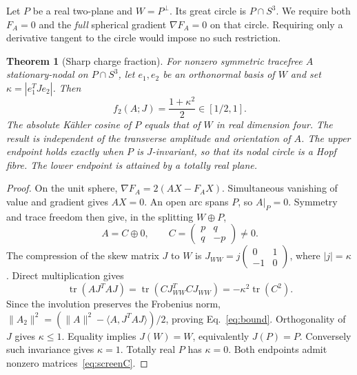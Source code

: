 \documentclass[11pt,a4paper]{article}
\newtheorem{theorem}{Theorem}\newtheorem{corollary}{Corollary}
\newcommand{\tr}{\operatorname{tr}}\newcommand{\asympart}{\operatorname{Asym}}
\begin{document}
Let $P$ be a real two-plane and $W=P^\perp$. Its great circle is
$P\cap S^3$. We require both $F_A=0$ and the \emph{full} spherical
gradient $\nabla F_A=0$ on that circle. Requiring only a derivative
tangent to the circle would impose no such restriction.

\begin{theorem}[Sharp charge fraction]
\label{thm:charge}
For nonzero symmetric tracefree $A$ stationary-nodal on $P\cap S^3$,
let $e_1,e_2$ be an orthonormal basis of $W$ and set
$\kappa=|e_1^TJe_2|$. Then
\begin{equation}
 \boxed{f_2(A;J)=\frac{1+\kappa^2}{2}\in[1/2,1].}
 \label{eq:bound}
\end{equation}
The absolute K\"ahler cosine of $P$ equals that of $W$ in real dimension four.
The result is independent of the transverse amplitude and orientation
of $A$. The upper endpoint holds exactly when $P$ is $J$-invariant,
so that its nodal circle is a Hopf fibre. The lower endpoint is attained
by a totally real plane.
\end{theorem}

\begin{proof}
On the unit sphere, $\nabla F_A=2(AX-F_AX)$. Simultaneous vanishing
of value and gradient gives $AX=0$. An open arc spans $P$, so $A|_P=0$.
Symmetry and trace freedom then give, in the splitting $W\oplus P$,
\begin{equation}
 A=C\oplus0,\qquad
 C=\begin{pmatrix}p&q\\q&-p\end{pmatrix}\ne0.
 \label{eq:screenC}
\end{equation}
The compression of the skew matrix $J$ to $W$ is
$J_{WW}=j\left(\begin{smallmatrix}0&1\\-1&0\end{smallmatrix}\right)$,
where $|j|=\kappa$. Direct multiplication gives
\begin{equation}
 \tr(AJ^TAJ)=\tr(CJ_{WW}^TCJ_{WW})
 =-\kappa^2\tr(C^2).
 \label{eq:traceidentity}
\end{equation}
Since the involution preserves the Frobenius norm,
$\|A_2\|^2=(\|A\|^2-\langle A,J^TAJ\rangle)/2$, proving
Eq.~\eqref{eq:bound}. Orthogonality of $J$ gives $\kappa\le1$.
Equality implies $J(W)=W$, equivalently $J(P)=P$. Conversely such
invariance gives $\kappa=1$. Totally real $P$ has $\kappa=0$.
Both endpoints admit nonzero matrices~\eqref{eq:screenC}.
\end{proof}
\end{document}
